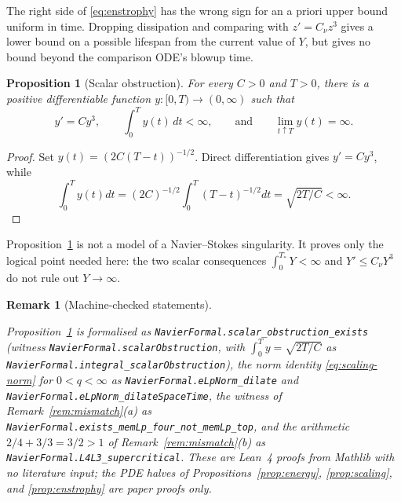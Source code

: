 \documentclass[11pt]{article}
\newtheorem{proposition}[theorem]{Proposition}
\newtheorem{remark}[theorem]{Remark}
\theoremstyle{definition}
\theoremstyle{plain}
\begin{document}
The right side of \eqref{eq:enstrophy} has the wrong sign for an a priori
upper bound uniform in time.  Dropping dissipation and comparing with
$z'=C_\nu z^3$ gives a lower bound on a possible lifespan from the current
value of $Y$, but gives no bound beyond the comparison ODE's blowup time.

\begin{proposition}[Scalar obstruction]\label{prop:ode}
For every $C>0$ and $T>0$, there is a positive differentiable function
$y:[0,T)\to(0,\infty)$ such that
\[
 y'=Cy^3,\qquad \int_0^T y(t)\,dt<\infty,
 \qquad\text{and}\qquad \lim_{t\uparrow T}y(t)=\infty.
\]
\end{proposition}

\begin{proof}
Set $y(t)=(2C(T-t))^{-1/2}$.  Direct differentiation gives $y'=Cy^3$, while
\[
 \int_0^T y(t)dt=(2C)^{-1/2}\int_0^T(T-t)^{-1/2}dt
 =\sqrt{2T/C}<\infty.
\]
\end{proof}

Proposition~\ref{prop:ode} is not a model of a Navier--Stokes singularity.
It proves only the logical point needed here: the two scalar consequences
$\int_0^{T_*}Y<\infty$ and $Y'\le C_\nu Y^3$ do not rule out $Y\to\infty$.

\begin{remark}[Machine-checked statements]\label{rem:lean}
\begin{sloppypar}
Proposition~\ref{prop:ode} is formalised as
\texttt{NavierFormal.\allowbreak scalar\_obstruction\_exists} (witness
\texttt{NavierFormal.\allowbreak scalarObstruction}, with
$\int_0^Ty=\sqrt{2T/C}$ as \texttt{NavierFormal.\allowbreak integral\_scalarObstruction}),
the norm identity \eqref{eq:scaling-norm} for $0<q<\infty$ as
\texttt{NavierFormal.\allowbreak eLpNorm\_dilate} and
\texttt{NavierFormal.\allowbreak eLpNorm\_dilateSpaceTime}, the witness of
Remark~\ref{rem:mismatch}(a) as
\texttt{NavierFormal.\allowbreak exists\_memLp\_four\_not\_memLp\_top}, and the
arithmetic $2/4+3/3=3/2>1$ of Remark~\ref{rem:mismatch}(b) as
\texttt{NavierFormal.\allowbreak L4L3\_supercritical}.  These are Lean~4 proofs from
Mathlib with no literature input; the PDE halves of
Propositions~\ref{prop:energy}, \ref{prop:scaling}, and
\ref{prop:enstrophy} are paper proofs only.
\end{sloppypar}
\end{remark}
\end{document}
